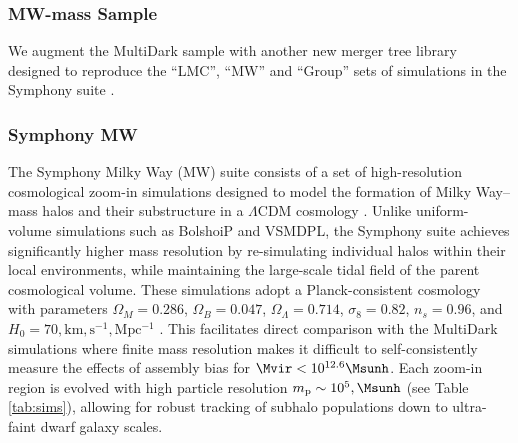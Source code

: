 

\subsubsection{MW-mass Sample}
\label{sec:satgen_MW}

We augment the MultiDark sample with another new merger tree library designed to reproduce the ``LMC'', ``MW'' and ``Group'' sets of simulations in the Symphony suite \cite{Nadler.etal.23}.

\subsubsection{Symphony MW}
\label{sec:symphony}

The Symphony Milky Way (MW) suite consists of a set of high-resolution cosmological zoom-in simulations designed to model the formation of Milky Way–mass halos and their substructure in a $\Lambda$CDM cosmology \citep{Mao.etal.15, Nadler.etal.23}. Unlike uniform-volume simulations such as BolshoiP and VSMDPL, the Symphony suite achieves significantly higher mass resolution by re-simulating individual halos within their local environments, while maintaining the large-scale tidal field of the parent cosmological volume. These simulations adopt a Planck-consistent cosmology with parameters $\Omega_{M}=0.286$, $\Omega_{B}=0.047$, $\Omega_{\Lambda}=0.714$, $\sigma_8 = 0.82$, $n_s=0.96$, and $H_0=70,\mathrm{km,s^{-1},Mpc^{-1}}$ \citep{Nadler.etal.23}. This facilitates direct comparison with the MultiDark simulations where finite mass resolution makes it difficult to self-consistently measure the effects of assembly bias for $\Mvir < 10^{12.6} \Msunh$. Each zoom-in region is evolved with high particle resolution $m_{\rm p} \sim 10^{5},\Msunh$ (see Table \ref{tab:sims}), allowing for robust tracking of subhalo populations down to ultra-faint dwarf galaxy scales. 

